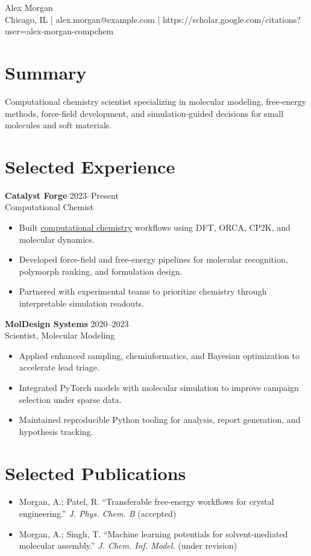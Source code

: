 \documentclass[10pt]{article}
\begin{document}
\begin{center}
  {\LARGE Alex Morgan}\\
  Chicago, IL \quad | \quad alex.morgan@example.com \quad | \quad
  https://scholar.google.com/citations?user=alex-morgan-compchem
\end{center}

\section*{Summary}
Computational chemistry scientist specializing in molecular modeling, free-energy methods,
force-field development, and simulation-guided decisions for small molecules and soft materials.

\section*{Selected Experience}
\textbf{Catalyst Forge} \hfill 2023--Present\\
Computational Chemist
\begin{itemize}
  \item Built \underline{computational chemistry} workflows using DFT, ORCA, CP2K, and molecular dynamics.
  \item Developed force-field and free-energy pipelines for molecular recognition, polymorph ranking, and formulation design.
  \item Partnered with experimental teams to prioritize chemistry through interpretable simulation readouts.
\end{itemize}

\textbf{MolDesign Systems} \hfill 2020--2023\\
Scientist, Molecular Modeling
\begin{itemize}
  \item Applied enhanced sampling, cheminformatics, and Bayesian optimization to accelerate lead triage.
  \item Integrated PyTorch models with molecular simulation to improve campaign selection under sparse data.
  \item Maintained reproducible Python tooling for analysis, report generation, and hypothesis tracking.
\end{itemize}

\section*{Selected Publications}
\begin{itemize}
  \item Morgan, A.; Patel, R. ``Transferable free-energy workflows for crystal engineering.'' \textit{J. Phys. Chem. B} (accepted)
  \item Morgan, A.; Singh, T. ``Machine learning potentials for solvent-mediated molecular assembly.'' \textit{J. Chem. Inf. Model.} (under revision)
\end{itemize}
\end{document}
